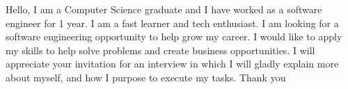Hello, I am a Computer Science graduate and I have worked as a software engineer for 1 year. I am a fast learner and tech enthusiast. I am looking for a software engineering opportunity to help grow my career. I would like to apply my skills to help solve problems and create business opportunities. I will appreciate your invitation for an interview in which I will gladly explain more about myself, and how I purpose to execute my tasks. Thank you